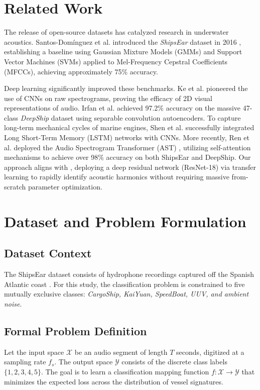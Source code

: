 \documentclass[conference]{IEEEtran}
\begin{document}
\section{Related Work}
The release of open-source datasets has catalyzed research in underwater acoustics. Santos-Domínguez et al. introduced the \textit{ShipsEar} dataset in 2016 \cite{santos2016shipsear}, establishing a baseline using Gaussian Mixture Models (GMMs) and Support Vector Machines (SVMs) applied to Mel-Frequency Cepstral Coefficients (MFCCs), achieving approximately 75\% accuracy. 

Deep learning significantly improved these benchmarks. Ke et al. \cite{ke2018cnn} pioneered the use of CNNs on raw spectrograms, proving the efficacy of 2D visual representations of audio. Irfan et al. \cite{irfan2021deepship} achieved 97.2\% accuracy on the massive 47-class \textit{DeepShip} dataset using separable convolution autoencoders. To capture long-term mechanical cycles of marine engines, Shen et al. \cite{shen2020crnn} successfully integrated Long Short-Term Memory (LSTM) networks with CNNs. More recently, Ren et al. \cite{ren2022ast} deployed the Audio Spectrogram Transformer (AST) \cite{gong2021ast}, utilizing self-attention mechanisms to achieve over 98\% accuracy on both ShipsEar and DeepShip. Our approach aligns with \cite{he2016resnet}, deploying a deep residual network (ResNet-18) via transfer learning to rapidly identify acoustic harmonics without requiring massive from-scratch parameter optimization.

\section{Dataset and Problem Formulation}
\subsection{Dataset Context}
The ShipsEar dataset consists of hydrophone recordings captured off the Spanish Atlantic coast \cite{santos2016shipsear}. For this study, the classification problem is constrained to five mutually exclusive classes: \textit{CargoShip, KaiYuan, SpeedBoat, UUV, and ambient noise}. 

\subsection{Formal Problem Definition}
Let the input space $\mathcal{X}$ be an audio segment of length $T$ seconds, digitized at a sampling rate $f_s$. The output space $\mathcal{Y}$ consists of the discrete class labels $\{1, 2, 3, 4, 5\}$. The goal is to learn a classification mapping function $f: \mathcal{X} \rightarrow \mathcal{Y}$ that minimizes the expected loss across the distribution of vessel signatures.
\end{document}
